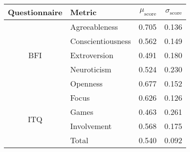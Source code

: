 \setlength{\tabcolsep}{0pt} 
\begin{tabular*}{\columnwidth}{@{\extracolsep{\fill}\quad}clrr@{}}
\textbf{Questionnaire} & \textbf{Metric} & \( \mu_\text{score} \) & \( \sigma_\text{score} \) \\
\toprule
\multirow{5}{*}{BFI} 
    & Agreeableness &               0.705 &                  0.136 \\
    & Conscientiousness &               0.562 &                  0.149 \\
    & Extroversion &               0.491 &                  0.180 \\
    & Neuroticism &               0.524 &                  0.230 \\
    & Openness &               0.677 &                  0.152 \\
\cline{1-4}
\multirow{4}{*}{ITQ} 
    & Focus &               0.626 &                  0.126 \\
    & Games &               0.463 &                  0.261 \\
    & Involvement &               0.568 &                  0.175 \\
    & Total &               0.540 &                  0.092 \\
\bottomrule
\end{tabular*}